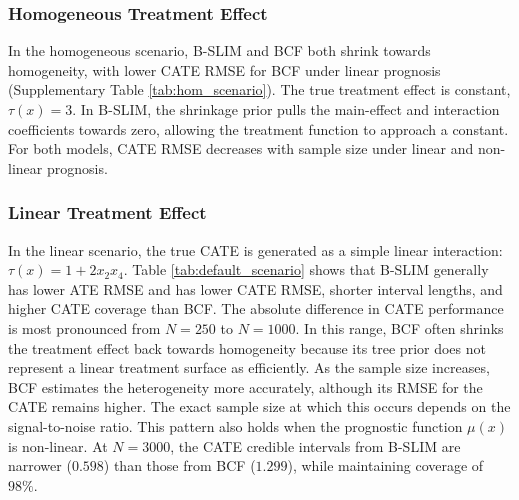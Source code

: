 \documentclass[12pt]{article}
\begin{document}
\subsubsection{Homogeneous Treatment Effect}
In the homogeneous scenario, B-SLIM and BCF both shrink towards homogeneity, with lower CATE RMSE for BCF under linear prognosis (Supplementary Table \ref{tab:hom_scenario}). The true treatment effect is constant, $\tau(x)=3$. In B-SLIM, the shrinkage prior pulls the main-effect and interaction coefficients towards zero, allowing the treatment function to approach a constant. For both models, CATE RMSE decreases with sample size under linear and non-linear prognosis.
\par\smallskip

\subsubsection{Linear Treatment Effect}

In the linear scenario, the true CATE is generated as a simple linear interaction: $\tau(x) = 1 + 2x_2x_4$. Table \ref{tab:default_scenario} shows that B-SLIM generally has lower ATE RMSE and has lower CATE RMSE, shorter interval lengths, and higher CATE coverage than BCF. The absolute difference in CATE performance is most pronounced from $N=250$ to $N=1000$. In this range, BCF often shrinks the treatment effect back towards homogeneity because its tree prior does not represent a linear treatment surface as efficiently. As the sample size increases, BCF estimates the heterogeneity more accurately, although its RMSE for the CATE remains higher. The exact sample size at which this occurs depends on the signal-to-noise ratio. This pattern also holds when the prognostic function $\mu(x)$ is non-linear. At $N=3000$, the CATE credible intervals from B-SLIM are narrower ($0.598$) than those from BCF ($1.299$), while maintaining coverage of $98\%$.
\end{document}
